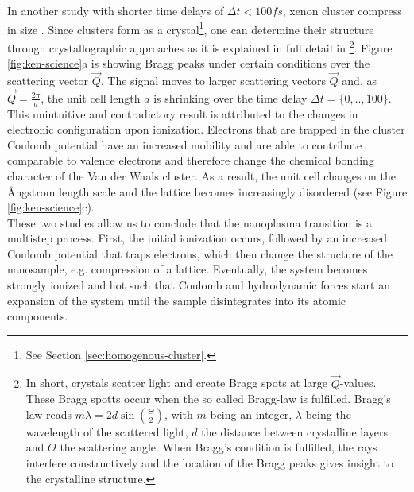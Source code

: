 In another study with shorter time delays of $\Delta t<100 fs$, xenon cluster compress in size \citep{Ferguson-2016-SciAdv}. Since clusters form as a crystal\footnote{See Section \ref{sec:homogenous-cluster}.}, one can determine their structure through crystallographic approaches as it is explained in full detail in \citep[][chapter 5]{Als-Nielson-2011-JWS}\footnote{In short, crystals scatter light and create Bragg spots at large $\vec{Q}$-values. These Bragg spotts occur when the so called Bragg-law is fulfilled. Bragg's law reads $m \lambda = 2d \sin\left(\frac{\Theta}{2}\right)$, with $m$ being an integer, $\lambda$ being the wavelength of the scattered light, $d$ the distance between crystalline layers and $\Theta$ the scattering angle. When Bragg's condition is fulfilled, the rays interfere constructively and the location of the Bragg peaks gives insight to the crystalline structure.}. Figure \ref{fig:ken-science}a is showing Bragg peaks under certain conditions over the scattering vector $\vec{Q}$. The signal moves to larger scattering vectors $\vec{Q}$ and, as $\vec{Q}=\frac{2\pi}{a}$, the unit cell length $a$ is shrinking over the time delay $\Delta t = \{0,..,100\}$. This unintuitive and contradictory result is attributed to the changes in electronic configuration upon ionization. Electrons that are trapped in the cluster Coulomb potential have an increased mobility and are able to contribute comparable to valence electrons and therefore change the chemical bonding character of the Van der Waals cluster. As a result, the unit cell changes on the {\AA}ngstrom length scale and the lattice becomes increasingly disordered (see Figure \ref{fig:ken-science}c).\\
These two studies allow us to conclude that the nanoplasma transition is a multistep process. First, the initial ionization occurs, followed by an increased Coulomb potential that traps electrons, which then change the structure of the nanosample, e.g. compression of a lattice. Eventually, the system becomes strongly ionized and hot such that Coulomb and hydrodynamic forces start an expansion of the system until the sample disintegrates into its atomic components.
%
%
%
